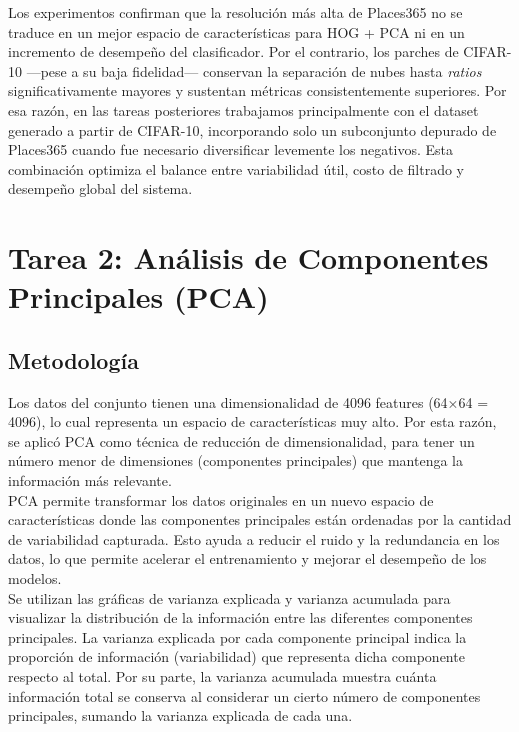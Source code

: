 \documentclass{article}
\begin{document}
Los experimentos confirman que la resolución más alta de Places365 no se traduce en un mejor espacio de características para HOG + PCA ni en un incremento de desempeño del clasificador. Por el contrario, los parches de CIFAR-10 —pese a su baja fidelidad— conservan la separación de nubes hasta \textit{ratios} significativamente mayores y sustentan métricas consistentemente superiores. Por esa razón, en las tareas posteriores trabajamos principalmente con el dataset generado a partir de CIFAR-10, incorporando solo un subconjunto depurado de Places365 cuando fue necesario diversificar levemente los negativos. Esta combinación optimiza el balance entre variabilidad útil, costo de filtrado y desempeño global del sistema.


\pagebreak

\section*{Tarea 2: Análisis de Componentes Principales (PCA)}

\subsection*{Metodología}

Los datos del conjunto tienen una dimensionalidad de 4096 features (64×64 = 4096), lo cual representa un espacio de características muy alto. Por esta razón, se aplicó PCA como técnica de reducción de dimensionalidad, para tener un número menor de dimensiones (componentes principales) que mantenga la información más relevante.\\

PCA permite transformar los datos originales en un nuevo espacio de características donde las componentes principales están ordenadas por la cantidad de variabilidad capturada. Esto ayuda a reducir el ruido y la redundancia en los datos, lo que permite acelerar el entrenamiento y mejorar el desempeño de los modelos.\\

Se utilizan las gráficas de varianza explicada y varianza acumulada para visualizar la distribución de la información entre las diferentes componentes principales. La varianza explicada por cada componente principal indica la proporción de información (variabilidad) que representa dicha componente respecto al total. Por su parte, la varianza acumulada muestra cuánta información total se conserva al considerar un cierto número de componentes principales, sumando la varianza explicada de cada una.\\
\end{document}
